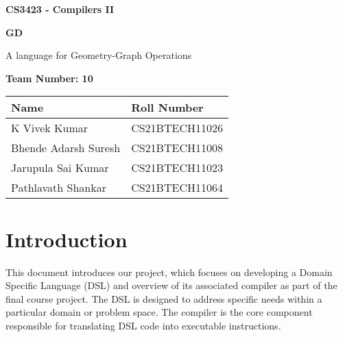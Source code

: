 \documentclass{article}
\begin{document}
\begin{titlepage}
    \thisfancypage{\doublebox}{}
    \begin{center}
        \vspace*{1cm}
        \Large \textbf{CS3423 - Compilers II}
        
        \hrulefill
       
        \vspace{2cm}
        \Huge \textbf{GD}
        
        \normalsize A language for Geometry-Graph Operations
        
        \vspace{2cm}
        
        
       \large \textbf{}
        
        \large \textbf{Team Number: 10}
        
        \vspace{1.5cm}
        
        \begin{tabular}{ l  l }
            \hline
            \textbf{Name} & \textbf{Roll Number} \\
            \hline
            K Vivek Kumar & CS21BTECH11026 \\
            Bhende Adarsh Suresh & CS21BTECH11008 \\
            Jarupula Sai Kumar & CS21BTECH11023 \\
            Pathlavath Shankar & CS21BTECH11064 \\
            \hline
        \end{tabular}
        
        
    \end{center}
        
\end{titlepage}

\tableofcontents
\newpage



\section{Introduction}
This document introduces our project, which focuses on developing a Domain Specific Language (DSL) and overview of its associated compiler as part of the final course project. The DSL is designed to address specific needs within a particular domain or problem space. The compiler is the core component responsible for translating DSL code into executable instructions.
\end{document}
